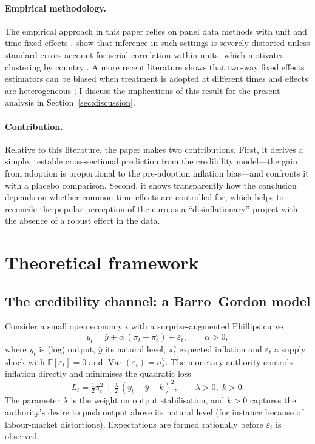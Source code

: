 \documentclass[11pt,a4paper]{article}
\numberwithin{equation}{section}
\theoremstyle{definition}
\theoremstyle{remark}
\begin{document}
\paragraph{Empirical methodology.} The empirical approach in this paper relies on panel data methods with unit and time fixed effects \citep{wooldridge2010,angrist2009}. \citet{bertrand2004} show that inference in such settings is severely distorted unless standard errors account for serial correlation within units, which motivates clustering by country \citep{cameron2015}. A more recent literature shows that two-way fixed effects estimators can be biased when treatment is adopted at different times and effects are heterogeneous \citep{goodmanbacon2021}; I discuss the implications of this result for the present analysis in Section~\ref{sec:discussion}.

\paragraph{Contribution.} Relative to this literature, the paper makes two contributions. First, it derives a simple, testable cross-sectional prediction from the credibility model---the gain from adoption is proportional to the pre-adoption inflation bias---and confronts it with a placebo comparison. Second, it shows transparently how the conclusion depends on whether common time effects are controlled for, which helps to reconcile the popular perception of the euro as a ``disinflationary'' project with the absence of a robust effect in the data.

\section{Theoretical framework}\label{sec:theory}

\subsection{The credibility channel: a Barro--Gordon model}
Consider a small open economy $i$ with a surprise-augmented Phillips curve
\begin{equation}
y_t = \bar{y} + \alpha\,(\pi_t - \pi_t^e) + \varepsilon_t, \qquad \alpha>0,
\label{eq:phillips}
\end{equation}
where $y_t$ is (log) output, $\bar{y}$ its natural level, $\pi_t^e$ expected inflation and $\varepsilon_t$ a supply shock with $\mathbb{E}[\varepsilon_t]=0$ and $\operatorname{Var}(\varepsilon_t)=\sigma^2_\varepsilon$. The monetary authority controls inflation directly and minimises the quadratic loss
\begin{equation}
L_t = \tfrac{1}{2}\pi_t^2 + \tfrac{\lambda}{2}\,(y_t - \bar{y} - k)^2, \qquad \lambda>0,\; k>0.
\label{eq:loss}
\end{equation}
The parameter $\lambda$ is the weight on output stabilisation, and $k>0$ captures the authority's desire to push output above its natural level (for instance because of labour-market distortions). Expectations are formed rationally before $\varepsilon_t$ is observed.
\end{document}
